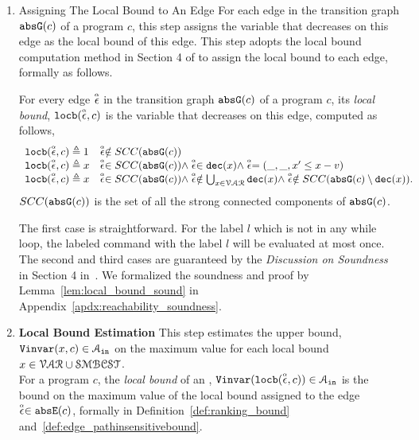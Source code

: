 \begin{enumerate}
\item {Assigning The Local Bound to An Edge}
For each edge in the transition graph $\mathtt{abs}{\mathtt{G}}(c)$ of a program $c$,
this step assigns the variable that decreases on this edge as the local bound  of this edge.
This step adopts the local bound computation method in Section 4 of \cite{sinn2017complexity} to assign the local bound to each edge,
formally as follows.
\begin{defn}
  \label{def:ranking_gen}
For every edge $\stackrel{\scriptscriptstyle{\alpha}}{\mathtt{\epsilon}{}}$ in the transition graph $\mathtt{abs}{\mathtt{G}}(c)$ of a program $c$,
its \emph{local bound}, $\mathtt{locb}(\stackrel{\scriptscriptstyle{\alpha}}{\mathtt{\epsilon}{}}, c)$
is the variable that decreases on this edge, computed as follows,
%
\[ 
\begin{array}{ll}
  \mathtt{locb}(\stackrel{\scriptscriptstyle{\alpha}}{\mathtt{\epsilon}{}}, c) \triangleq 1 
  & \stackrel{\scriptscriptstyle{\alpha}}{\mathtt{\epsilon}{}} \notin SCC(\mathtt{abs}{\mathtt{G}}(c))
  \\
  \mathtt{locb}(\stackrel{\scriptscriptstyle{\alpha}}{\mathtt{\epsilon}{}}, c) \triangleq x
  & \stackrel{\scriptscriptstyle{\alpha}}{\mathtt{\epsilon}{}} \in SCC(\mathtt{abs}{\mathtt{G}}(c)) \land \stackrel{\scriptscriptstyle{\alpha}}{\mathtt{\epsilon}{}} \in \mathtt{dec}(x) \land  \stackrel{\scriptscriptstyle{\alpha}}{\mathtt{\epsilon}{}} = (\_, \_ , x' \leq x - v) \\
  \mathtt{locb}(\stackrel{\scriptscriptstyle{\alpha}}{\mathtt{\epsilon}{}}, c) \triangleq x
  & \stackrel{\scriptscriptstyle{\alpha}}{\mathtt{\epsilon}{}} \in SCC(\mathtt{abs}{\mathtt{G}}(c)) \land 
  \stackrel{\scriptscriptstyle{\alpha}}{\mathtt{\epsilon}{}}  \notin \bigcup_{x \in \mathcal{VAR}} \mathtt{dec}(x)
  \land \stackrel{\scriptscriptstyle{\alpha}}{\mathtt{\epsilon}{}} \notin SCC(\mathtt{abs}{\mathtt{G}}(c) \setminus \mathtt{dec}(x)).
\end{array}
\]
$SCC(\mathtt{abs}{\mathtt{G}}(c))$ is the set of all the strong connected components of $\mathtt{abs}{\mathtt{G}}(c)$.
\end{defn}
  The first case is straightforward. 
  For the label $l$ which is not in any while loop, 
  the labeled command with the label $l$ will be 
  evaluated at most once. 
  The second and third cases are guaranteed by the \emph{Discussion on Soundness} in Section 4 in~\cite{sinn2017complexity}.
  We formalized the soundness and proof by Lemma~\ref{lem:local_bound_sound} in Appendix~\ref{apdx:reachability_soundness}.
\item \textbf{Local Bound Estimation}
This step estimates the upper bound, ${\mathtt{Vinvar}}(x, c) \in \mathcal{A}_{\mathtt{in}}$
on the maximum value for each local bound  $x \in  \mathcal{VAR} \cup \mathcal{SMBCST}$.
\\
For a program $c$, the \emph{local bound} of an ,
${\mathtt{Vinvar}}(\mathtt{locb}(\stackrel{\scriptscriptstyle{\alpha}}{\mathtt{\epsilon}{}}, c)) \in \mathcal{A}_{\mathtt{in}}$ is 
the bound on the maximum value of the local bound 
assigned to the edge $\stackrel{\scriptscriptstyle{\alpha}}{\mathtt{\epsilon}{}} \in \mathtt{abs}{\mathtt{E}}(c)$, formally in Definition~\ref{def:ranking_bound} and~\ref{def:edge_pathinsensitivebound}.

\end{enumerate}
